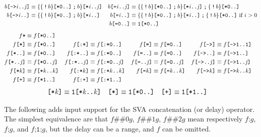 \documentclass[a4paper,twoside,10pt,DIV=12]{scrreprt}
\DeclareMathOperator{\NOT}{\texttt{!}}
\newcommand{\FUSION}{\mathbin{\texttt{:}}}
\newcommand{\CONCAT}{\mathbin{\texttt{;}}}
\newcommand{\DELAY}[1]{\mathbin{\texttt{\#\##1}}}
\newcommand{\0}{\texttt{0}}
\newcommand{\1}{\texttt{1}}
\newcommand{\STAR}[1]{\texttt{[*#1]}}
\newcommand{\FSTAR}[1]{\texttt{[:*#1]}}
\newcommand{\STARALT}{\texttt{*}}
\newcommand{\EQUAL}[1]{\texttt{[=#1]}}
\newcommand{\GOTO}[1]{\texttt{[->#1]}}
\newcommand{\PLUS}{\texttt{[+]}}
\newcommand{\FPLUS}{\texttt{[:+]}}
\newcommand\mvar[1]{\ensuremath{\mathit{#1}}}
\begin{document}
\begin{align*}
  b\GOTO{\mvar{i}..\mvar{j}} &\equiv \mathtt{\{\{}\NOT b\mathtt{\}}\STAR{0..}\CONCAT b\mathtt{\}}\STAR{\mvar{i}..\mvar{j}} &
  b\EQUAL{\mvar{i}..\mvar{j}} &\equiv \mathtt{\{\{}\NOT b\mathtt{\}}\STAR{0..}\CONCAT b\mathtt{\}}\STAR{\mvar{i}..\mvar{j}}\CONCAT \mathtt{\{}\NOT b\mathtt{\}}\STAR{0..} \\
  b\GOTO{\mvar{i}..} &\equiv \mathtt{\{\{}\NOT b\mathtt{\}}\STAR{0..}\CONCAT b\mathtt{\}}\STAR{\mvar{i}..} &
  b\EQUAL{\mvar{i}..} &\equiv \mathtt{\{\{}\NOT b\mathtt{\}}\STAR{0..}\CONCAT b\mathtt{\}}\STAR{\mvar{i}..}\CONCAT \mathtt{\{}\NOT b\mathtt{\}}\STAR{0..}\text{~if~}i>0 \\
  && b\EQUAL{0..} &\equiv \1\STAR{0..}
\end{align*}
\begin{align*}
  f\STARALT &\equiv f\STAR{0..}\\
  f\STAR{}    &\equiv f\STAR{0..}  &
  f\FSTAR{}    &\equiv f\FSTAR{0..}  &
  f\EQUAL{}   &\equiv f\EQUAL{0..} &
  f\GOTO{}   &\equiv f\GOTO{1..1} \\
  f\STAR{..}  &\equiv f\STAR{0..}  &
  f\FSTAR{..}  &\equiv f\FSTAR{0..}  &
  f\EQUAL{..}  &\equiv f\EQUAL{0..} &
  f\GOTO{..}  &\equiv f\GOTO{1..} \\
  f\STAR{..\mvar{j}} &\equiv f\STAR{0..\mvar{j}} &
  f\FSTAR{..\mvar{j}} &\equiv f\FSTAR{0..\mvar{j}} &
  f\EQUAL{..\mvar{j}} &\equiv f\EQUAL{0..\mvar{j}} &
  f\GOTO{..\mvar{j}} &\equiv f\GOTO{1..\mvar{j}} \\
  f\STAR{\mvar{k}}  &\equiv f\STAR{\mvar{k}..\mvar{k}}  &
  f\FSTAR{\mvar{k}}  &\equiv f\FSTAR{\mvar{k}..\mvar{k}}  &
  f\EQUAL{\mvar{k}}   &\equiv f\EQUAL{\mvar{k}..\mvar{k}} &
  f\GOTO{\mvar{k}}   &\equiv f\GOTO{\mvar{k}..\mvar{k}} \\
  f\PLUS{}    &\equiv f\STAR{1..} &
  f\FPLUS{}    &\equiv f\FSTAR{1..}
\end{align*}
\begin{align*}
\STAR{\mvar{k}}    &\equiv \1\STAR{\mvar{k}..\mvar{k}} &
\STAR{}    &\equiv \1\STAR{0..} &
\PLUS{}    &\equiv \1\STAR{1..}
\end{align*}

The following adds input support for the SVA concatenation (or delay)
operator.  The simplest equivalence are that $f \DELAY{0} g$,
$f \DELAY{1} g$, $f \DELAY{2} g$ mean respectively $f \FUSION g$,
$f \CONCAT g$, and $f \CONCAT \1\CONCAT g$, but the delay can be a
range, and $f$ can be omitted.
\end{document}
